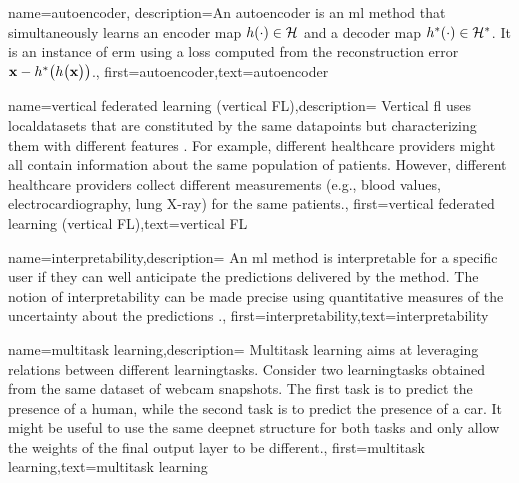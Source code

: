 {name={autoencoder},
	description={An autoencoder is an \gls{ml} method that simultaneously learns an encoder map 
		$h(\cdot) \in \mathcal{H}$ and a decoder map $h^{*}(\cdot) \in \mathcal{H}^{*}$. 
		It is an instance of \gls{erm} using a \gls{loss} computed from the reconstruction error 
		${\bf x} - h^{*}\big(  h \big( {\bf x} \big) \big)$.},
	first={autoencoder},text={autoencoder}
} 

{name={vertical federated learning (vertical FL)},description=
	{Vertical \gls{fl} uses \gls{localdataset}s that are constituted 
	 by the same \gls{datapoint}s but characterizing them with different \gls{feature}s \cite{VFLChapter}. 
     For example, different healthcare providers might all contain information 
     about the same population of patients. However, different healthcare providers 
     collect different measurements (e.g., blood values, electrocardiography, lung X-ray) 
     for the same patients.},
	first={vertical federated learning (vertical FL)},text={vertical FL}
} 

{name={interpretability},description=
		{An \gls{ml} method is interpretable for a specific user if 
			they can well anticipate the \gls{prediction}s delivered by the method. 
			The notion of interpretability can be made precise using quantitative 
			measures of the \gls{uncertainty} about the \gls{prediction}s \cite{JunXML2020}.},
		first={interpretability},text={interpretability}
}

{name={multitask learning},description=
	{Multitask learning aims at leveraging relations between 
	 different \gls{learningtask}s. Consider two \gls{learningtask}s obtained from the 
	 same \gls{dataset} of webcam snapshots. The first task is to predict the presence 
	 of a human, while the second task is to predict the presence of a car. It might be useful 
	 to use the same \gls{deepnet} structure for both tasks and only allow the \gls{weights} of 
	 the final output layer to be different.},
	first={multitask learning},text={multitask learning}
}

